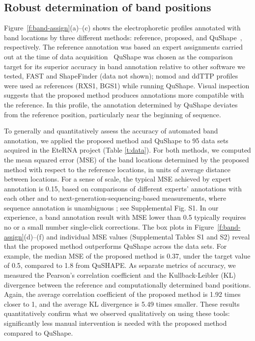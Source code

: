 \subsection{Robust determination of band positions}\label{ss:band-position}
Figure~\ref{f:band-assign}(a)--(c) shows the electrophoretic profiles annotated with band locations by three different methods: reference, proposed, and QuShape~\citep{Karabiber2013}, respectively. The reference annotation was based an expert assignments carried out at the time of data acquisition~\citep{lee2014eterna} QuShape was chosen as the comparison target for its superior accuracy in band annotation relative to other software we tested, FAST and ShapeFinder (data not shown); nomod and ddTTP profiles were used as references (RXS1, BGS1) while running QuShape. Visual inspection suggests that the proposed method produces annotations more compatible with the reference. In this profile, the annotation determined by QuShape deviates from the reference position, particularly near the beginning of sequence.

To generally and quantitatively assess the accuracy of automated band annotation, we applied the proposed method and QuShape to 95 data sets acquired in the EteRNA project (Table \ref{t:data}). For both methods, we computed the mean squared error (MSE) of the band locations determined by the proposed method with respect to the reference locations, in units of average distance between locations. For a sense of scale, the typical MSE achieved by expert annotation is 0.15, based on comparisons of different experts' annotations with each other and to next-generation-sequencing-based measurements, where sequence annotation is unambiguous \citep{Kladwang2014}; see Supplemental Fig. S1. In our experience, a band annotation result with MSE lower than 0.5 typically requires no or a small number single-click corrections. The box plots in Figure~\ref{f:band-assign}(d)--(f) and individual MSE values (Supplemental Tables S1 and S2) reveal that the proposed method outperforms QuShape across the data sets. For example, the median MSE of the proposed method is 0.37, under the target value of 0.5, compared to 1.8 from QuSHAPE. As separate metrics of accuracy, we measured the Pearson's correlation coefficient and the Kullback-Leibler (KL) divergence between the reference and computationally determined band positions.  Again, the average correlation coefficient of the proposed method is 1.92 times closer to 1, and the average KL divergence is 5.49 times smaller. These results quantitatively confirm what we observed qualitatively on using these tools: significantly less manual intervention is needed with the proposed method compared to QuShape.


